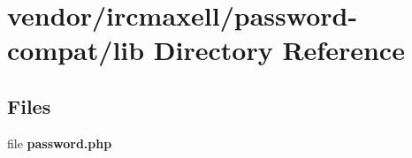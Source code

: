 \section{vendor/ircmaxell/password-\/compat/lib Directory Reference}
\label{dir_29224d3b6301e4da0e1671a6e1b79cdb}
\subsection*{Files}
\begin{DoxyCompactItemize}
\item 
file {\bf password.\+php}
\end{DoxyCompactItemize}
